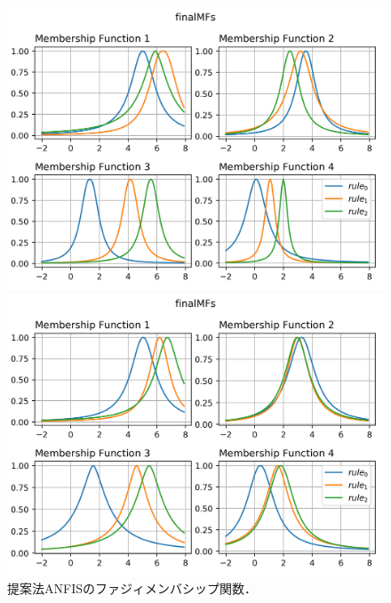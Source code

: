 \documentclass{ujarticle}
\begin{document}
\begin{figure}[!htb]
  \begin{minipage}{0.45\hsize}
    \centering
    \includegraphics[width=\textwidth]{Final_mf_noise_00.png}
  \end{minipage}
  \begin{minipage}{0.45\hsize}
    \centering
    \includegraphics[width=\textwidth]{Final_mf_noise_50.png}
  \end{minipage}
  \caption{提案法ANFISのファジィメンバシップ関数．}
  \label{fig: membership of proposed robust ANFIS}
\end{figure}
\end{document}
